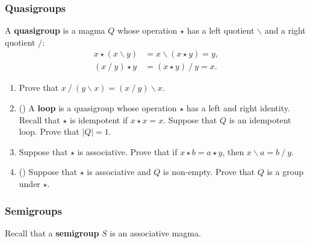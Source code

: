 \documentclass[11pt,paper=letter]{scrartcl}
\newcommand{\qover}{\mathbin{/}}
\newcommand{\qunder}{\mathbin{\backslash}}
\begin{document}
\subsubsection*{Quasigroups}

A \textbf{quasigroup} is a magma $Q$ whose operation $\star$ has a left quotient $\qunder$ and a right quotient $\qover$:
\begin{align*}
  x \star (x \qunder y) &= x \qunder (x \star y) = y, \\
  (x \qover y) \star y &= (x \star y) \qover y = x.
\end{align*}

\begin{enumerate}

\item Prove that $x \qover (y \qunder x) = (x \qover y) \qunder x$.

\item (\href{https://proofwiki.org/wiki/Idempotent_Non-Trivial_Quasigroup_is_Not_a_Loop}{\!}) A \textbf{loop} is a quasigroup whose operation $\star$ has a left and right identity. Recall that $\star$ is idempotent if $x \star x = x$. Suppose that $Q$ is an idempotent loop. Prove that $|Q| = 1$.

\item Suppose that $\star$ is associative. Prove that if $x \star b = a \star y$, then $x \qunder a = b \qover y$.
%

\item (\href{https://1lab.dev/Algebra.Quasigroup.Instances.Group\#associative-quasigroups-as-groups}{\!}) Suppose that $\star$ is associative and $Q$ is non-empty. Prove that $Q$ is a group under $\star$.

\end{enumerate}

\subsubsection*{Semigroups}

Recall that a \textbf{semigroup} $S$ is an associative magma.
\end{document}
